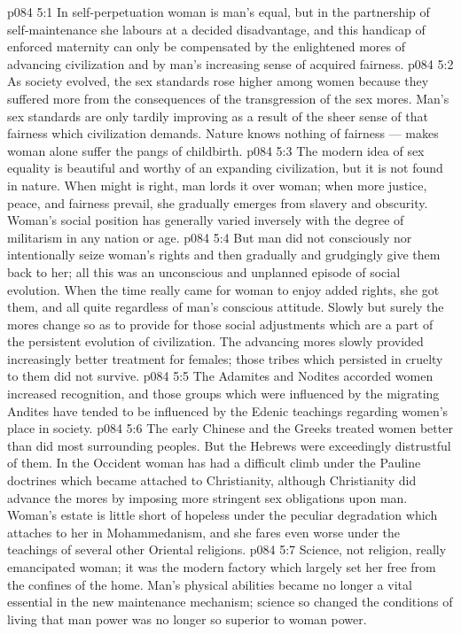 \vs p084 5:1 In self\hyp{}perpetuation woman is man’s equal, but in the partnership of self\hyp{}maintenance she labours at a decided disadvantage, and this handicap of enforced maternity can only be compensated by the enlightened mores of advancing civilization and by man’s increasing sense of acquired fairness.
\vs p084 5:2 As society evolved, the sex standards rose higher among women because they suffered more from the consequences of the transgression of the sex mores. Man’s sex standards are only tardily improving as a result of the sheer sense of that fairness which civilization demands. Nature knows nothing of fairness --- makes woman alone suffer the pangs of childbirth.
\vs p084 5:3 The modern idea of sex equality is beautiful and worthy of an expanding civilization, but it is not found in nature. When might is right, man lords it over woman; when more justice, peace, and fairness prevail, she gradually emerges from slavery and obscurity. Woman’s social position has generally varied inversely with the degree of militarism in any nation or age.
\vs p084 5:4 But man did not consciously nor intentionally seize woman’s rights and then gradually and grudgingly give them back to her; all this was an unconscious and unplanned episode of social evolution. When the time really came for woman to enjoy added rights, she got them, and all quite regardless of man’s conscious attitude. Slowly but surely the mores change so as to provide for those social adjustments which are a part of the persistent evolution of civilization. The advancing mores slowly provided increasingly better treatment for females; those tribes which persisted in cruelty to them did not survive.
\vs p084 5:5 \pc The Adamites and Nodites accorded women increased recognition, and those groups which were influenced by the migrating Andites have tended to be influenced by the Edenic teachings regarding women’s place in society.
\vs p084 5:6 The early Chinese and the Greeks treated women better than did most surrounding peoples. But the Hebrews were exceedingly distrustful of them. In the Occident woman has had a difficult climb under the Pauline doctrines which became attached to Christianity, although Christianity did advance the mores by imposing more stringent sex obligations upon man. Woman’s estate is little short of hopeless under the peculiar degradation which attaches to her in Mohammedanism, and she fares even worse under the teachings of several other Oriental religions.
\vs p084 5:7 \pc Science, not religion, really emancipated woman; it was the modern factory which largely set her free from the confines of the home. Man’s physical abilities became no longer a vital essential in the new maintenance mechanism; science so changed the conditions of living that man power was no longer so superior to woman power.
